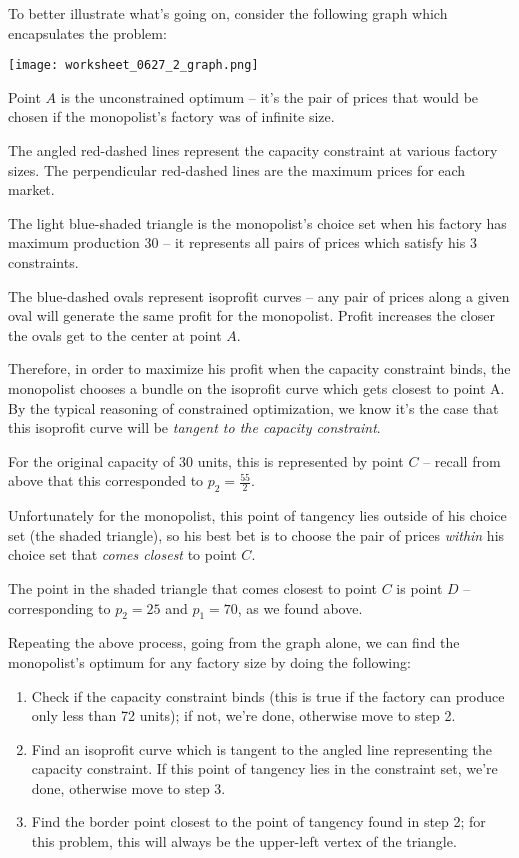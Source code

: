 \documentclass{article}
\newenvironment{solution}{\color{red}}{\color{black}}
\begin{document}
\begin{solution}
\begin{enumerate}
To better illustrate what's going on, consider the following graph which encapsulates the problem:

\texttt{[image: worksheet\_0627\_2\_graph.png]}

Point $A$ is the unconstrained optimum -- it's the pair of prices that would be chosen if the monopolist's factory was of infinite size.

The angled red-dashed lines represent the capacity constraint at various factory sizes. The perpendicular red-dashed lines are the maximum prices for each market.

The light blue-shaded triangle is the monopolist's choice set when his factory has maximum production 30 -- it represents all pairs of prices which satisfy his 3 constraints.

The blue-dashed ovals represent isoprofit curves -- any pair of prices along a given oval will generate the same profit for the monopolist. Profit increases the closer the ovals get to the center at point $A$.

Therefore, in order to maximize his profit when the capacity constraint binds, the monopolist chooses a bundle on the isoprofit curve which gets closest to point A. By the typical reasoning of constrained optimization, we know it's the case that this isoprofit curve will be \emph{tangent to the capacity constraint}.

For the original capacity of 30 units, this is represented by point $C$ -- recall from above that this corresponded to $p_2 = \frac{55}2$.

Unfortunately for the monopolist, this point of tangency lies outside of his choice set (the shaded triangle), so his best bet is to choose the pair of prices \emph{within} his choice set that \emph{comes closest} to point $C$.

The point in the shaded triangle that comes closest to point $C$ is point $D$ -- corresponding to $p_2 = 25$ and $p_1 = 70$, as we found above. 

Repeating the above process, going from the graph alone, we can find the monopolist's optimum for any factory size by doing the following:

\begin{enumerate}
\item Check if the capacity constraint binds (this is true if the factory can produce only less than 72 units); if not, we're done, otherwise move to step 2.
\item Find an isoprofit curve which is tangent to the angled line representing the capacity constraint. If this point of tangency lies in the constraint set, we're done, otherwise move to step 3.
\item Find the border point closest to the point of tangency found in step 2; for this problem, this will always be the upper-left vertex of the triangle.
\end{enumerate}


\end{enumerate}
\end{solution}
\end{document}
